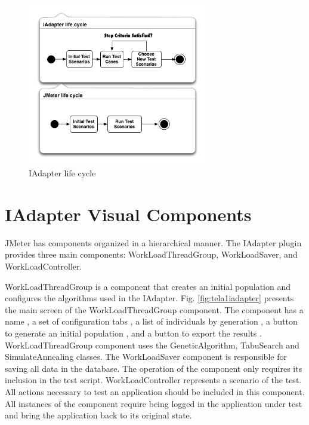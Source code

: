 \documentclass[espaco=umemeio,chapter=TITLE,twoside,openright]{abnt}
\begin{document}
\begin{figure}[h]
\centering
\includegraphics[width=0.7\textwidth]{./images/lifecycle2.png}
\caption{IAdapter life cycle}
\label{fig:iadapterlifecycle}
\end{figure}


\section{IAdapter Visual Components}

JMeter has components organized  in a hierarchical manner. The IAdapter plugin provides three main components: WorkLoadThreadGroup, WorkLoadSaver, and WorkLoadController.

WorkLoadThreadGroup is a component that creates an initial population and configures the algorithms used in the IAdapter. Fig. \ref{fig:tela1iadapter} presents the main screen of the WorkLoadThreadGroup component. The component has a name , a set of configuration tabs , a list of individuals by generation , a button to generate an initial population , and a button to export the results . WorkLoadThreadGroup component uses the GeneticAlgorithm, TabuSearch and SimulateAnnealing classes.  The WorkLoadSaver component is responsible for saving all data in the database. The operation of the component only requires its inclusion in the test script. WorkLoadController represents a scenario of the test. All actions necessary to test an application should be included in this component. All instances of the component require being logged in the application under test and bring the application back to its original state.
\end{document}
